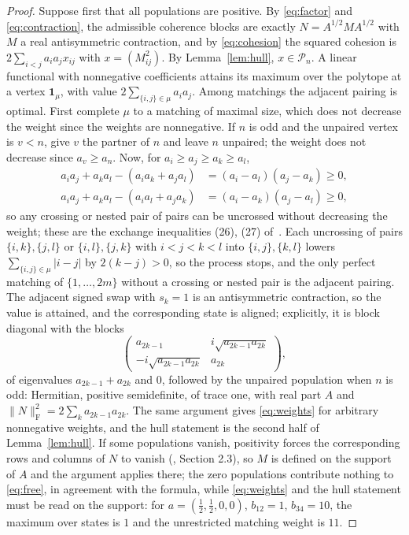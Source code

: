 \documentclass[11pt]{article}
\newcommand{\F}{\mathrm F}
\newcommand{\cP}{\mathcal P}
\begin{document}
\begin{proof}
Suppose first that all populations are positive. By \eqref{eq:factor} and
\eqref{eq:contraction}, the admissible coherence blocks are exactly
$N=A^{1/2}MA^{1/2}$ with $M$ a real antisymmetric contraction, and by
\eqref{eq:cohesion} the squared cohesion is $2\sum_{i<j}a_ia_jx_{ij}$ with
$x=(M_{ij}^2)$. By Lemma~\ref{lem:hull}, $x\in\cP_n$. A linear functional with
nonnegative coefficients attains its maximum over the polytope at a vertex
$\mathbf1_\mu$, with value $2\sum_{\{i,j\}\in\mu}a_ia_j$. Among matchings the
adjacent pairing is optimal. First complete $\mu$ to a matching of maximal
size, which does not decrease the weight since the weights are nonnegative.
If $n$ is odd and the unpaired vertex is $v<n$, give $v$ the partner of $n$
and leave $n$ unpaired; the weight does not decrease since $a_v\ge a_n$. Now,
for $a_i\ge a_j\ge a_k\ge a_l$,
\begin{align*}
a_ia_j+a_ka_l-(a_ia_k+a_ja_l)&=(a_i-a_l)(a_j-a_k)\ge0,\\
a_ia_j+a_ka_l-(a_ia_l+a_ja_k)&=(a_i-a_k)(a_j-a_l)\ge0,
\end{align*}
so any crossing or nested pair of pairs can be uncrossed without decreasing
the weight; these are the exchange inequalities (26), (27) of~\cite{gil}. Each
uncrossing of pairs $\{i,k\},\{j,l\}$ or $\{i,l\},\{j,k\}$ with $i<j<k<l$ into
$\{i,j\},\{k,l\}$ lowers $\sum_{\{i,j\}\in\mu}|i-j|$ by $2(k-j)>0$, so the
process stops, and the only perfect matching of $\{1,\dots,2m\}$ without a
crossing or nested pair is the adjacent pairing. The adjacent signed swap with
$s_k=1$ is an antisymmetric contraction, so the value is attained, and the
corresponding state is aligned; explicitly, it is block diagonal with the
blocks
\[
\begin{pmatrix}a_{2k-1}&i\sqrt{a_{2k-1}a_{2k}}\\-i\sqrt{a_{2k-1}a_{2k}}&a_{2k}\end{pmatrix},
\]
of eigenvalues $a_{2k-1}+a_{2k}$ and $0$, followed by the unpaired population
when $n$ is odd: Hermitian, positive semidefinite, of trace one, with real
part $A$ and $\|N\|_\F^2=2\sum_ka_{2k-1}a_{2k}$. The same argument gives \eqref{eq:weights}
for arbitrary nonnegative weights, and the hull statement is the second half
of Lemma~\ref{lem:hull}. If some populations vanish, positivity forces the
corresponding rows and columns of $N$ to vanish (\cite{gil}, Section 2.3), so
$M$ is defined on the support of $A$ and the argument applies there; the zero
populations contribute nothing to \eqref{eq:free}, in agreement with the
formula, while \eqref{eq:weights} and the hull statement must be read on the
support: for $a=(\tfrac12,\tfrac12,0,0)$, $b_{12}=1$, $b_{34}=10$, the
maximum over states is $1$ and the unrestricted matching weight is $11$.
\end{proof}
\end{document}
